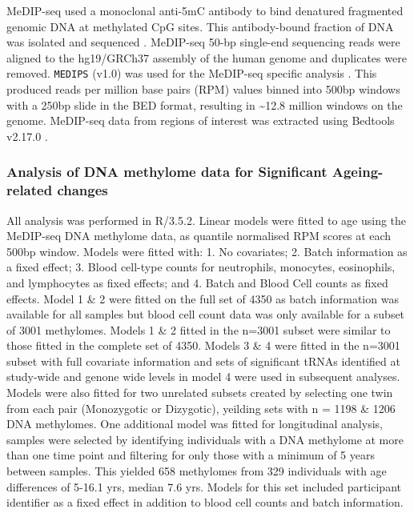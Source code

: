 \documentclass[
]{book}
\begin{document}
MeDIP-seq used a monoclonal anti-5mC antibody to bind denatured fragmented genomic DNA at methylated CpG sites.
This antibody-bound fraction of DNA was isolated and sequenced \citep{Down2009}.
MeDIP-seq 50-bp single-end sequencing reads were aligned to the hg19/GRCh37 assembly of the human genome and duplicates were removed.
\texttt{MEDIPS} (v1.0) was used for the MeDIP-seq specific analysis \citep{Lienhard2014}.
This produced reads per million base pairs (RPM) values binned into 500bp windows with a 250bp slide in the BED format, resulting in \textasciitilde12.8 million windows on the genome.
MeDIP-seq data from regions of interest was extracted using Bedtools v2.17.0 \citep{Quinlan2010}.

\hypertarget{medipmodels}{%
\subsubsection{Analysis of DNA methylome data for Significant Ageing-related changes}\label{medipmodels}}

All analysis was performed in R/3.5.2.
Linear models were fitted to age using the MeDIP-seq DNA methylome data, as quantile normalised RPM scores at each 500bp window.
Models were fitted with: 1. No covariates; 2. Batch information as a fixed effect; 3. Blood cell-type counts for neutrophils, monocytes, eosinophils, and lymphocytes as fixed effects; and 4. Batch and Blood Cell counts as fixed effects.
Model 1 \& 2 were fitted on the full set of 4350 as batch information was available for all samples but blood cell count data was only available for a subset of 3001 methylomes.
Models 1 \& 2 fitted in the n=3001 subset were similar to those fitted in the complete set of 4350.
Models 3 \& 4 were fitted in the n=3001 subset with full covariate information and sets of significant tRNAs identified at study-wide and genone wide levels in model 4 were used in subsequent analyses.
Models were also fitted for two unrelated subsets created by selecting one twin from each pair (Monozygotic or Dizygotic), yeilding sets with n = 1198 \& 1206 DNA methylomes.
One additional model was fitted for longitudinal analysis, samples were selected by identifying individuals with a DNA methylome at more than one time point and filtering for only those with a minimum of 5 years between samples.
This yielded 658 methylomes from 329 individuals with age differences of 5-16.1 yrs, median 7.6 yrs.
Models for this set included participant identifier as a fixed effect in addition to blood cell counts and batch information.
\end{document}
